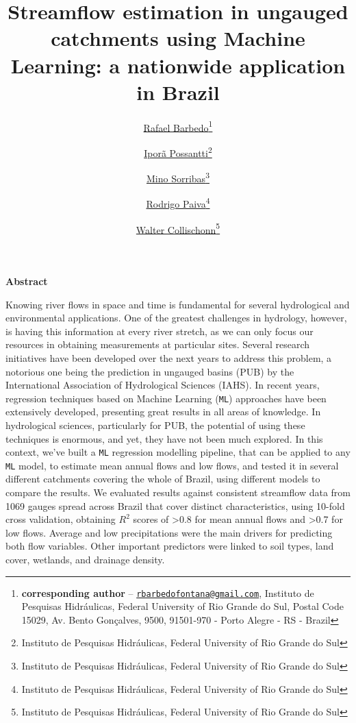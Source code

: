 \documentclass[12pt]{article}
\title{\Large{\textsf{\textbf{Streamflow estimation in ungauged catchments using Machine Learning: a nationwide application in Brazil}}}}
\author{\href{https://orcid.org/0000-0002-3910-9244}{Rafael Barbedo}\thanks{\textbf{corresponding author} -- \href{mailto:rbarbedofontana@gmail.com}{\texttt{rbarbedofontana@gmail.com}}, Instituto de Pesquisas Hidráulicas, Federal University of Rio Grande do Sul, Postal Code 15029, Av. Bento Gonçalves, 9500, 91501-970 - Porto Alegre - RS - Brazil} \and \href{https://orcid.org/0000-0002-2194-4516}{Iporã Possantti}\thanks{Instituto de Pesquisas Hidráulicas, Federal University of Rio Grande do Sul} \and \href{https://orcid.org/0000-0002-1053-0131}{Mino Sorribas}\thanks{Instituto de Pesquisas Hidráulicas, Federal University of Rio Grande do Sul} \and \href{https://orcid.org/0000-0003-2918-6681}{Rodrigo Paiva}\thanks{Instituto de Pesquisas Hidráulicas, Federal University of Rio Grande do Sul} \and \href{https://orcid.org/0000-0002-7630-396X}{Walter Collischonn}\thanks{Instituto de Pesquisas Hidráulicas, Federal University of Rio Grande do Sul}}
\begin{document}
\maketitle  %

\begin{adjustwidth}{20pt}{20pt}
\begin{spacing}{0.8}
	\small
	\begin{center}
		\vspace{10mm}
		\textsf{\textbf{Abstract}}
		\vspace{5mm}
	\end{center}
	
	\noindent Knowing river flows in space and time is fundamental for several hydrological and environmental applications. One of the greatest challenges in hydrology, however, is having this information at every river stretch, as we can only focus our resources in obtaining measurements at particular sites. Several research initiatives have been developed over the next years to address this problem, a notorious one being the prediction in ungauged basins (PUB) by the International Association of Hydrological Sciences (IAHS). In recent years, regression techniques based on Machine Learning (\texttt{\texttt{ML}}) approaches have been extensively developed, presenting great results in all areas of knowledge. In hydrological sciences, particularly for PUB, the potential of using these techniques is enormous, and yet, they have not been much explored. In this context, we’ve built a \texttt{ML} regression modelling pipeline, that can be applied to any \texttt{ML} model, to estimate mean annual flows and low flows, and tested it in several different catchments covering the whole of Brazil, using different models to compare the results. We evaluated results against consistent streamflow data from 1069 gauges spread across Brazil that cover distinct characteristics, using 10-fold cross validation, obtaining $R^2$ scores of >0.8 for mean annual flows and >0.7 for low flows. Average and low precipitations were the main drivers for predicting both flow variables. Other important predictors were linked to soil types, land cover, wetlands, and drainage density. \\[2ex]
	

\end{spacing}
\end{adjustwidth}
\end{document}

